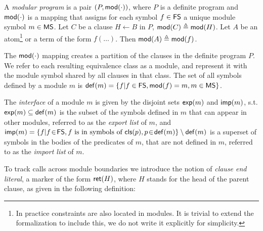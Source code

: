 \documentclass{llncs}
\newcommand{\finalcompression}[1]{\vspace*{#1}}
\begin{document}
\begin{definition}
  \label{def:modprog}
  A \emph{modular program} is a pair
  $( P, \mathsf{mod}(\cdot))$, where
  $P$ is a definite program and $\mathsf{mod}(\cdot)$ is a mapping that assigns
  for each symbol $f \in \textsf{FS}$ a unique module symbol $m \in \textsf{MS}$.
  Let $C$ be a clause $H \leftarrow B$ in $P$, $\mathsf{mod}(C) \triangleq \mathsf{mod}(H)$.
  Let $A$ be an atom\footnote{In practice constraints are also located
    in modules. It is trivial to extend the formalization
    to include this, we do not write it explicitly for
    simplicity. }
  or a term of the form $f(\ldots)$. Then $\mathsf{mod}(A) \triangleq \mathsf{mod}(f)$.
\end{definition}

\finalcompression{-1mm}
The $\mathsf{mod}(\cdot)$ mapping
creates a partition
of the clauses in the definite program $P$. We refer to each resulting
equivalence class as a module, and represent it with the module
symbol shared by all clauses in that class.
%
The set of all symbols defined by a module $m$ is
$\mathsf{def}(m) = \{ f | f \in \textsf{FS}, \mathsf{mod}(f) = m, m \in \textsf{MS}\}$.
%

\begin{definition}
  \label{def:modprogitf}
  The \emph{interface} of a module $m$ is given by the disjoint sets
  $\mathsf{exp}(m)$ and $\mathsf{imp}(m)$, s.t.
  $\mathsf{exp}(m) \subseteq \mathsf{def}(m)$ is the subset of the symbols
  defined in $m$ that can appear in other modules, referred to as
  the \emph{export list} of $m$,
  and %
  $\mathsf{imp}(m) = \{ f | f\!\in\!\textsf{FS}, f \textrm{ is in symbols of }
  \mathsf{cls}(p), p\!\in\!\mathsf{def}(m)\} \setminus \mathsf{def}(m)$ is a superset of
  symbols in the bodies of the predicates of $m$, that are not
  defined in $m$, referred to as the \emph{import list} of $m$.
\end{definition}

To track calls across module boundaries we introduce the notion of
\emph{clause end literal}, a marker of the form $\textsf{ret}(H)$, where $H$
stands for the head of the parent clause,
as given in the following definition:
\end{document}
